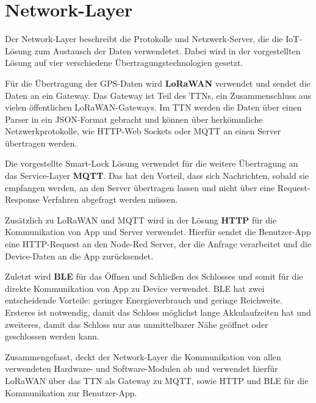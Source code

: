 
\section{Network-Layer} \label{network}
Der Network-Layer beschreibt die Protokolle und Netzwerk-Server, die die \ac{IoT}-Lösung zum Austausch der Daten verwendetet. Dabei wird in der vorgestellten Lösung auf vier verschiedene Übertragungstechnologien gesetzt.

Für die Übertragung der \ac{GPS}-Daten wird \textbf{\ac{LoRaWAN}} verwendet und sendet die Daten an ein Gateway. Das Gateway ist Teil des \ac{TTN}s, ein Zusammenschluss aus vielen öffentlichen \ac{LoRaWAN}-Gateways. Im \ac{TTN} werden die Daten über einen Parser in ein \ac{JSON}-Format gebracht und können über herkömmliche Netzwerkprotokolle, wie \ac{HTTP}-Web Sockets oder \ac{MQTT} an einen Server übertragen werden.

Die vorgestellte Smart-Lock Lösung verwendet für die weitere Übertragung an das Service-Layer \textbf{\ac{MQTT}}. Das hat den Vorteil, dass sich Nachrichten, sobald sie empfangen werden, an den Server übertragen lassen und nicht über eine Request-Response Verfahren abgefragt werden müssen. 

Zusätzlich zu \ac{LoRaWAN} und \ac{MQTT} wird in der Lösung \textbf{\ac{HTTP}} für die Kommunikation von App und Server verwendet. Hierfür sendet die Benutzer-App eine \ac{HTTP}-Request an den Node-Red Server, der die Anfrage verarbeitet und die Device-Daten an die App zurücksendet. 

Zuletzt wird \textbf{\ac{BLE}} für das Öffnen und Schließen des Schlosses und somit für die direkte Kommunikation von App zu Device verwendet. \ac{BLE} hat zwei entscheidende Vorteile: geringer Energieverbrauch und geringe Reichweite. Ersteres ist notwendig, damit das Schloss möglichst lange Akkulaufzeiten hat und zweiteres, damit das Schloss nur aus unmittelbarer Nähe geöffnet oder geschlossen werden kann.

Zusammengefasst, deckt der Network-Layer die Kommunikation von allen verwendeten Hardware- und Software-Modulen ab und verwendet hierfür \ac{LoRaWAN} über das \ac{TTN} als Gateway zu \ac{MQTT}, sowie \ac{HTTP} und \ac{BLE} für die Kommunikation zur Benutzer-App.